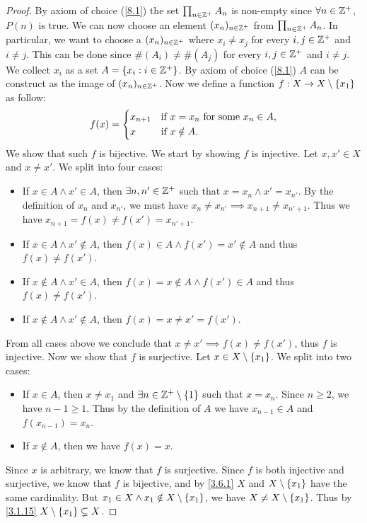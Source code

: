 \begin{proof}
  By axiom of choice (\cref{8.1}) the set \(\prod_{n \in \mathbb{Z}^+} A_n\) is non-empty since \(\forall n \in \mathbb{Z}^+\), \(P(n)\) is true.
  We can now choose an element \((x_n)_{n \in \mathbb{Z}^+}\) from \(\prod_{n \in \mathbb{Z}^+} A_n\).
  In particular, we want to choose a \((x_n)_{n \in \mathbb{Z}^+}\) where \(x_i \neq x_j\) for every \(i, j \in \mathbb{Z}^+\) and \(i \neq j\).
  This can be done since \(\#(A_i) \neq \#(A_j)\) for every \(i, j \in \mathbb{Z}^+\) and \(i \neq j\).
  We collect \(x_i\) as a set \(A = \left\lbrace x_i : i \in \mathbb{Z}^+\right\rbrace\).
  By axiom of choice (\cref{8.1}) \(A\) can be construct as the image of \((x_n)_{n \in \mathbb{Z}^+}\).
  Now we define a function \(f : X \to X \setminus \left\lbrace x_1\right\rbrace\) as follow:
  \[
    f(x) = \begin{dcases}
      x_{n + 1} & \text{if } x = x_n \text{ for some } x_n \in A, \\
      x         & \text{if } x \notin A.
    \end{dcases}
  \]
  We show that such \(f\) is bijective.
  We start by showing \(f\) is injective.
  Let \(x, x' \in X\) and \(x \neq x'\).
  We split into four cases:
  \begin{itemize}
    \item If \(x \in A \land x' \in A\), then \(\exists n, n' \in \mathbb{Z}^+\) such that \(x = x_n \land x' = x_{n'}\).
          By the definition of \(x_n\) and \(x_{n'}\), we must have \(x_n \neq x_{n'} \implies x_{n + 1} \neq x_{n' + 1}\).
          Thus we have \(x_{n + 1} = f(x) \neq f(x') = x_{n' + 1}\).
    \item If \(x \in A \land x' \notin A\), then \(f(x) \in A \land f(x') = x' \notin A\) and thus \(f(x) \neq f(x')\).
    \item If \(x \notin A \land x' \in A\), then \(f(x) = x \notin A \land f(x') \in A\) and thus \(f(x) \neq f(x')\).
    \item If \(x \notin A \land x' \notin A\), then \(f(x) = x \neq x' = f(x')\).
  \end{itemize}
  From all cases above we conclude that \(x \neq x' \implies f(x) \neq f(x')\), thus \(f\) is injective.
  Now we show that \(f\) is surjective.
  Let \(x \in X \setminus \left\lbrace x_1\right\rbrace\).
  We split into two cases:
  \begin{itemize}
    \item If \(x \in A\), then \(x \neq x_1\) and \(\exists n \in \mathbb{Z}^+ \setminus \left\lbrace1\right\rbrace\) such that \(x = x_n\).
          Since \(n \geq 2\), we have \(n - 1 \geq 1\).
          Thus by the definition of \(A\) we have \(x_{n - 1} \in A\) and \(f(x_{n - 1}) = x_n\).
    \item If \(x \notin A\), then we have \(f(x) = x\).
  \end{itemize}
  Since \(x\) is arbitrary, we know that \(f\) is surjective.
  Since \(f\) is both injective and surjective, we know that \(f\) is bijective, and by \cref{3.6.1} \(X\) and \(X \setminus \left\lbrace x_1\right\rbrace\) have the same cardinality.
  But \(x_1 \in X \land x_1 \notin X \setminus \left\lbrace x_1\right\rbrace\), we have \(X \neq X \setminus \left\lbrace x_1\right\rbrace\).
  Thus by \cref{3.1.15} \(X \setminus \left\lbrace x_1\right\rbrace \subsetneq X\).


\end{proof}
